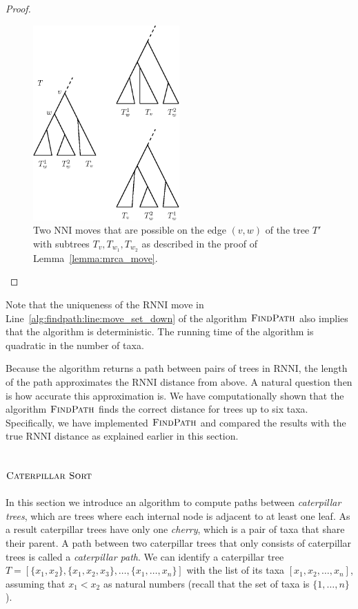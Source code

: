 \documentclass{amsart}
\newcommand{\nni}{\mathrm{NNI}}
\newcommand{\rnni}{\mathrm{RNNI}}
\newcommand{\csort}{\textsc{Caterpillar Sort}}
\newcommand{\findpath}{\textsc{FindPath}}
\begin{document}
\begin{proof}
\begin{figure}[H]
\centering
\includegraphics[width=0.5\textwidth]{mrca_move}
\vspace{12pt}
\caption{Two $\nni$ moves that are possible on the edge $(v,w)$ of the tree $T'$ with subtrees $T_v, T_{w_1}, T_{w_2}$ as described in the proof of Lemma~\ref{lemma:mrca_move}.}
\label{fig:mrca_move}
\end{figure}
\end{proof}

Note that the uniqueness of the $\rnni$ move in Line~\ref{alg:findpath:line:move_set_down} of the algorithm $\findpath$ also implies that the algorithm is deterministic.
The running time of the algorithm is quadratic in the number of taxa.

Because the algorithm returns a path between pairs of trees in $\rnni$, the length of the path approximates the $\rnni$ distance from above.
A natural question then is how accurate this approximation is.
We have computationally shown that the algorithm $\findpath$ finds the correct distance for trees up to six taxa.
Specifically, we have implemented $\findpath$ \autocite{Collienne2019} and compared the results with the true $\rnni$ distance as explained earlier in this section.


\subsection{$\csort$}
\label{section:alg_csort}

In this section we introduce an algorithm to compute paths between \emph{caterpillar trees}, which are trees where each internal node is adjacent to at least one leaf.
As a result caterpillar trees have only one \emph{cherry}, which is a pair of taxa that share their parent.
A path between two caterpillar trees that only consists of caterpillar trees is called a \emph{caterpillar path}.
We can identify a caterpillar tree $T = [\{x_1, x_2\}, \{x_1, x_2, x_3\}, \ldots, \{x_1, \ldots, x_n\}]$ with the list of its taxa $[x_1, x_2, \ldots, x_n]$, assuming that $x_1 < x_2$ as natural numbers (recall that the set of taxa is $\{1, \ldots, n\}$).
\end{document}
